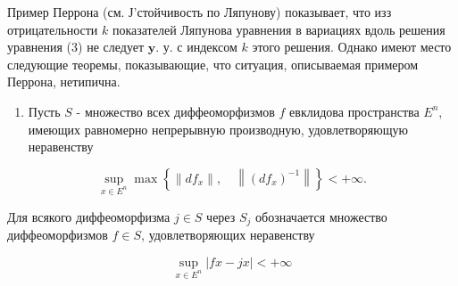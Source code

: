 \documentclass[10pt]{article}
\begin{document}
Пример Перрона (см. Ј'стойчивость по Ляпунову) показывает, что изз отрицательности $k$ показателей Ляпунова уравнения в вариациях вдоль решения уравнения (3) не следует $\mathbf{y}$. у. с индексом $k$ этого решения. Однако имеют место следующие теоремы, показывающие, что ситуация, описываемая примером Перрона, нетипична.



\begin{enumerate}

  \item Пусть $S$ - множество всех диффеоморфизмов $f$ евклидова пространства $E^{n}$, имеющих равномерно непрерывную производную, удовлетворяющую неравенству

\end{enumerate}



\[

\sup _{x \in E^{n}} \max \left\{\left\|d f_{x}\right\|, \quad\left\|\left(d f_{x}\right)^{-1}\right\|\right\}<+\infty .

\]



Для всякого диффеоморфизма $j \in S$ через $S_{j}$ обозначается множество диффеоморфизмов $f \in S$, удовлетворяющих неравенству



\[

\sup _{x \in E^{n}}|f x-j x|<+\infty

\]
\end{document}
